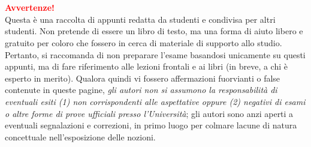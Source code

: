 \chapter*{}

\vspace*{0.3\paperheight}
\begin{center}
    \textcolor{red}{\textbf{Avvertenze!}}\\
    Questa è una raccolta di appunti redatta da studenti e
    condivisa per altri studenti. Non pretende di essere un libro
    di testo, ma una forma di aiuto libero e gratuito per coloro
    che fossero in cerca di materiale di supporto allo studio.
    Pertanto, si raccomanda di non preparare l'esame basandosi unicamente
    su questi appunti, ma di fare riferimento alle lezioni frontali
    e ai libri (in breve, a chi è esperto in merito). Qualora quindi
    vi fossero affermazioni fuorvianti o false contenute in queste
    pagine, \textit{gli autori non si assumono la responsabilità di eventuali
    esiti (1) non corrispondenti alle aspettative oppure (2) negativi di esami
    o altre forme di prove ufficiali presso l'Università}; gli autori sono anzi
    aperti a eventuali segnalazioni e correzioni, in primo luogo per colmare lacune di natura concettuale
    nell'esposizione delle nozioni.
\end{center}